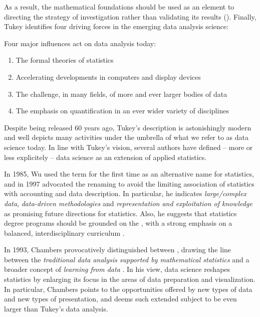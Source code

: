 As a result, the mathematical foundations should be used as an element to directing the strategy of investigation rather than validating its results ().
Finally, Tukey identifies four driving forces in the emerging data analysis science:
\begin{displayquote}
Four major influences act on data analysis today:
\begin{enumerate}
    \item The formal theories of statistics
    \item Accelerating developments in computers and display devices
    \item The challenge, in many fields, of more and ever larger bodies of data
    \item The emphasis on quantification in an ever wider variety of disciplines
\end{enumerate}
\end{displayquote}
Despite being released 60 years ago, Tukey's description is astonishingly modern and well depicts many activities under the umbrella of what we refer to as data science today.
In line with Tukey's vision, several authors have defined -- more or less explicitely -- data science as an extension of applied statistics.

In 1985, Wu used the term  for the first time as an alternative name for statistics, and in 1997 advocated the renaming  to avoid the limiting association of statistics with accounting and data description.
In particular, he indicates \textit{large/complex data}, \textit{data-driven methodologies} and \textit{representation and exploitation of knowledge} as promising future directions for statistics. Also, he suggests that statistics degree programs should be grounded on the , with a strong emphasis on a balanced, interdisciplinary curriculum \cite{wu1997statistic}.

In 1993, Chambers provocatively distinguished between , drawing the line between the \textit{traditional data analysis supported by mathematical statistics} and a broader concept of \textit{learning from data} \cite{chambers1993greater}.
In his view, data science reshapes statistics by enlarging its focus in the areas of data preparation and visualization. In particular, Chambers points to the opportunities offered by new types of data and new types of presentation, and deems such extended subject to be even larger than Tukey's data analysis.

